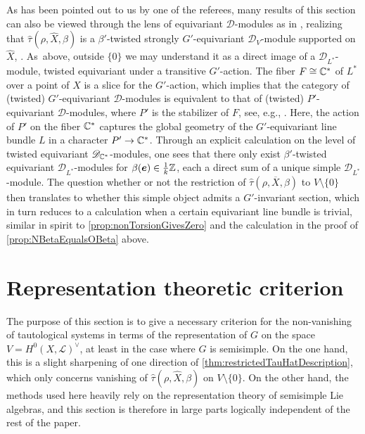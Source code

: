 \documentclass[11pt]{article}
\newcommand{\bme}{{\boldsymbol{e}}}
\newcommand{\cL}{\mathcal{L}}
\begin{document}
\begin{rmk}\label{rmk:RemarkToReferee}
As has been pointed out to us by one of the referees, many results of this section can also be viewed through the lens of equivariant $\mathscr D$\nobreakdash-mod\-ules as in \cite{BeilinsonBernstein_Jantzen}, realizing that $\hat \tau(\rho, \hat X, \beta)$ is a $\beta'$-twisted strongly $G'$-equivariant $\mathscr D_V$\nobreakdash-mod\-ule supported on $\hat X$, \cite[Def.\,p.\,16]{Hot98}. As~above, outside $\{0\}$ we may understand it as a direct image of a $\mathscr D_{L^*}$\nobreakdash-mod\-ule, twisted equivariant under a transitive $G'$-action. The fiber $F \cong {\mathbb C}^*$ of $L^*$ over a point of $X$ is a slice for the $G'$-action, which implies that the category of (twisted) $G'$-equivariant $\mathscr D$\nobreakdash-mod\-ules is equivalent to that of (twisted) $P'$-equivariant $\mathscr D$\nobreakdash-mod\-ules, where $P'$ is the stabilizer of $F$, see, e.g., \cite[Prop.\,4.5]{Lorincz-Walther}. Here, the action of $P'$ on the fiber ${\mathbb C}^*$ captures the global geometry of the $G'$-equivariant line bundle $L$ in a character $P' \to {\mathbb C}^*$. Through an explicit calculation on the level of twisted equivariant $\mathscr D_{{\mathbb C}^*}$\nobreakdash-mod\-ules, one sees that there only exist $\beta'$-twisted equivariant $\mathscr D_{L^*}$\nobreakdash-mod\-ules for $\beta(\bme)\in \frac{1}{k} \Z$, each a direct sum of a unique simple $\mathscr D_{L^*}$\nobreakdash-mod\-ule. The question whether or not the restriction of $\hat \tau(\rho, \overline X, \beta)$ to $V \setminus \{0\}$ then translates to whether this simple object admits a $G'$-invariant section, which in turn reduces to a calculation when a certain equivariant line bundle is trivial, similar in spirit to \cref{prop:nonTorsionGivesZero} and the calculation in the proof of \cref{prop:NBetaEqualsOBeta} above.
\end{rmk}

\section{Representation theoretic criterion}\label{sec:FormuleBeta}

The purpose of this section is to give a necessary criterion for the non-vanishing of tautological systems in terms of the representation of $G$ on the space $V=H^0(X,\cL)^\vee$, at least in the case where $G$ is semisimple. On the one hand, this is a slight sharpening of one direction of \cref{thm:restrictedTauHatDescription}, which only concerns vanishing of $\hat{\tau}(\rho,\hat{X},\beta)$ on $V\setminus\{0\}$. On the other hand, the methods used
here heavily rely on the representation theory of semisimple Lie algebras, and this section is therefore in large parts logically independent of the rest of the paper.
\end{document}
